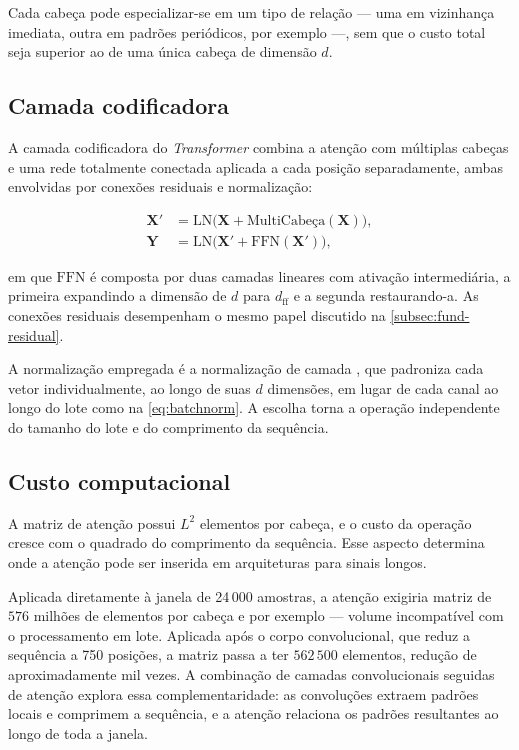 Cada cabeça pode especializar-se em um tipo de relação --- uma em vizinhança
imediata, outra em padrões periódicos, por exemplo ---, sem que o custo total
seja superior ao de uma única cabeça de dimensão $d$.

\subsection{Camada codificadora}
\label{subsec:fund-codificador}

A camada codificadora do \textit{Transformer} combina a atenção com
múltiplas cabeças e uma rede totalmente conectada aplicada a cada posição
separadamente, ambas envolvidas por conexões residuais e normalização:

\begin{align}
	\mathbf{X}' &= \mathrm{LN}\big(\mathbf{X} + \mathrm{MultiCabeça}(\mathbf{X})\big),
	\label{eq:codificador-1} \\
	\mathbf{Y} &= \mathrm{LN}\big(\mathbf{X}' + \mathrm{FFN}(\mathbf{X}')\big),
	\label{eq:codificador-2}
\end{align}

\noindent
em que $\mathrm{FFN}$ é composta por duas camadas lineares com ativação
intermediária, a primeira expandindo a dimensão de $d$ para $d_{\mathrm{ff}}$
e a segunda restaurando-a. As conexões residuais desempenham o mesmo papel
discutido na \autoref{subsec:fund-residual}.

A normalização empregada é a normalização de camada \cite{ba2016layer},
que padroniza cada vetor individualmente, ao longo de suas $d$ dimensões, em
lugar de cada canal ao longo do lote como na
\autoref{eq:batchnorm}. A escolha torna a operação independente do tamanho
do lote e do comprimento da sequência.

\subsection{Custo computacional}
\label{subsec:fund-atencao-custo}

A matriz de atenção possui $L^2$ elementos por cabeça, e o custo da operação
cresce com o quadrado do comprimento da sequência. Esse aspecto determina
onde a atenção pode ser inserida em arquiteturas para sinais longos.

Aplicada diretamente à janela de 24\,000 amostras, a atenção exigiria matriz
de $576$ milhões de elementos por cabeça e por exemplo --- volume
incompatível com o processamento em lote. Aplicada após o corpo
convolucional, que reduz a sequência a 750 posições, a matriz passa a ter
$562\,500$ elementos, redução de aproximadamente mil vezes. A combinação de
camadas convolucionais seguidas de atenção explora essa complementaridade:
as convoluções extraem padrões locais e comprimem a sequência, e a atenção
relaciona os padrões resultantes ao longo de toda a janela.

